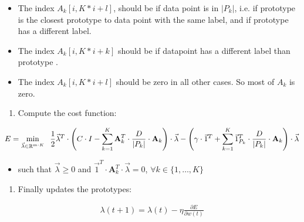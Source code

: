 \documentclass[letterpaper,10pt,english]{sphinxmanual}
\begin{document}
\begin{itemize}
\item {} 
The index \(A_k[i, K*i+l]\), should be  if data point  is in \(|P_k|\), i.e. if prototype  is the closest prototype to data point  with the same label, and if prototype  has a different label.

\item {} 
The index \(A_k[i, K*i+k]\) should be  if datapoint  has a different label than prototype .

\item {} 
The index \(A_k[i, K*i+l]\) should be zero in all other cases. So most of \(A_k\) is zero.

\end{itemize}
\begin{enumerate}
\def\theenumi{\arabic{enumi}}
\def\labelenumi{\theenumi .}
\makeatletter\def\p@enumii{\p@enumi \theenumi .}\makeatother
\setcounter{enumi}{6}
\item {} 
Compute the cost function:

\end{enumerate}
\begin{equation*}
\begin{split}E = \min_{\vec{\lambda} \in \mathbb{R}^{m\cdot K}} \hspace{2mm} \frac{1}{2} \vec{\lambda}^T \cdot \left(C \cdot I - \sum_{k=1}^{K} \textbf{A}_{k}^T \cdot \frac{D}{|P_k|} \cdot \textbf{A}_{k}\right)\cdot \vec{\lambda} - \left(\gamma \cdot \vec{1}^T + \sum_{k=1}^{K} \vec{1}_{P_k}^T \cdot \frac{D}{|P_k|} \cdot \textbf{A}_{k}\right) \cdot \vec{\lambda}\end{split}
\end{equation*}\begin{itemize}
\item {} 
such that \(\vec{\lambda} \geq 0\) and  \(\vec{1}^T \cdot \textbf{A}_{k}^T \cdot \vec{\lambda} = 0\), \(\forall k \in \{1,\dots,K\}\)

\end{itemize}
\begin{enumerate}
\def\theenumi{\arabic{enumi}}
\def\labelenumi{\theenumi .}
\makeatletter\def\p@enumii{\p@enumi \theenumi .}\makeatother
\setcounter{enumi}{7}
\item {} 
Finally updates the prototypes:

\end{enumerate}
\begin{equation*}
\begin{split}\lambda(t+1) = \lambda(t) - \eta \frac{\partial E}{\partial w(t)}\end{split}
\end{equation*}
\end{document}
